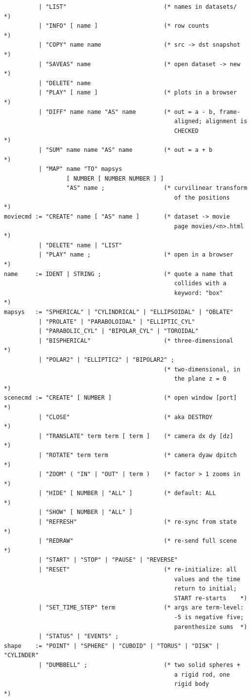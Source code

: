 \documentclass[11pt]{article}
\begin{document}
\begin{lstlisting}
          | "LIST"                            (* names in datasets/  *)
          | "INFO" [ name ]                   (* row counts          *)
          | "COPY" name name                  (* src -> dst snapshot *)
          | "SAVEAS" name                     (* open dataset -> new *)
          | "DELETE" name
          | "PLAY" [ name ]                   (* plots in a browser  *)
          | "DIFF" name name "AS" name        (* out = a - b, frame-
                                                 aligned; alignment is
                                                 CHECKED              *)
          | "SUM" name name "AS" name         (* out = a + b          *)
          | "MAP" name "TO" mapsys
                  [ NUMBER [ NUMBER NUMBER ] ]
                  "AS" name ;                 (* curvilinear transform
                                                 of the positions     *)
moviecmd := "CREATE" name [ "AS" name ]       (* dataset -> movie
                                                 page movies/<n>.html *)
          | "DELETE" name | "LIST"
          | "PLAY" name ;                     (* open in a browser   *)
name     := IDENT | STRING ;                  (* quote a name that
                                                 collides with a
                                                 keyword: "box"      *)
mapsys   := "SPHERICAL" | "CYLINDRICAL" | "ELLIPSOIDAL" | "OBLATE"
          | "PROLATE" | "PARABOLOIDAL" | "ELLIPTIC_CYL"
          | "PARABOLIC_CYL" | "BIPOLAR_CYL" | "TOROIDAL"
          | "BISPHERICAL"                     (* three-dimensional   *)
          | "POLAR2" | "ELLIPTIC2" | "BIPOLAR2" ;
                                              (* two-dimensional, in
                                                 the plane z = 0     *)
scenecmd := "CREATE" [ NUMBER ]               (* open window [port]  *)
          | "CLOSE"                           (* aka DESTROY         *)
          | "TRANSLATE" term term [ term ]    (* camera dx dy [dz]   *)
          | "ROTATE" term term                (* camera dyaw dpitch  *)
          | "ZOOM" ( "IN" | "OUT" | term )    (* factor > 1 zooms in *)
          | "HIDE" [ NUMBER | "ALL" ]         (* default: ALL        *)
          | "SHOW" [ NUMBER | "ALL" ]
          | "REFRESH"                         (* re-sync from state  *)
          | "REDRAW"                          (* re-send full scene  *)
          | "START" | "STOP" | "PAUSE" | "REVERSE"
          | "RESET"                           (* re-initialize: all
                                                 values and the time
                                                 return to initial;
                                                 START re-starts    *)
          | "SET_TIME_STEP" term              (* args are term-level:
                                                 -5 is negative five;
                                                 parenthesize sums  *)
          | "STATUS" | "EVENTS" ;
shape    := "POINT" | "SPHERE" | "CUBOID" | "TORUS" | "DISK" | "CYLINDER"
          | "DUMBBELL" ;                      (* two solid spheres +
                                                 a rigid rod, one
                                                 rigid body          *)


\end{lstlisting}
\end{document}
